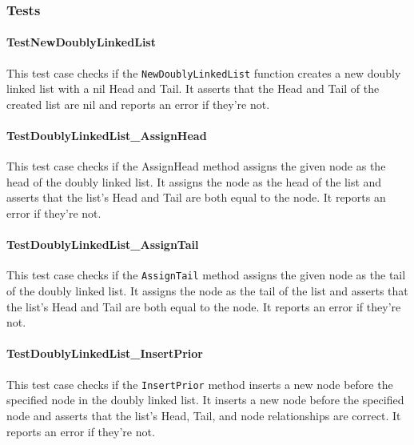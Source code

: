 \subsubsection*{Tests}
\paragraph{TestNewDoublyLinkedList}
This test case checks if the \lstinline{NewDoublyLinkedList} function creates a new doubly linked list with a nil Head and Tail. It asserts that the Head and Tail of the created list are nil and reports an error if they're not.

\paragraph{TestDoublyLinkedList\_AssignHead}
This test case checks if the AssignHead method assigns the given node as the head of the doubly linked list. It assigns the node as the head of the list and asserts that the list's Head and Tail are both equal to the node. It reports an error if they're not.

\paragraph{TestDoublyLinkedList\_AssignTail}
This test case checks if the \lstinline{AssignTail} method assigns the given node as the tail of the doubly linked list. It assigns the node as the tail of the list and asserts that the list's Head and Tail are both equal to the node. It reports an error if they're not.

\paragraph{TestDoublyLinkedList\_InsertPrior}
This test case checks if the \lstinline{InsertPrior} method inserts a new node before the specified node in the doubly linked list. It inserts a new node before the specified node and asserts that the list's Head, Tail, and node relationships are correct. It reports an error if they're not.

